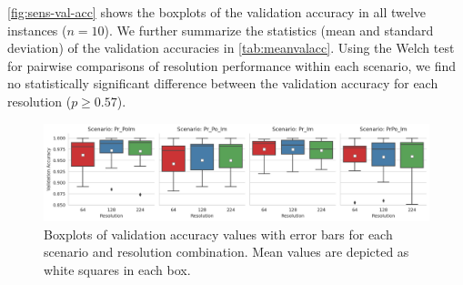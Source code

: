 \documentclass[Journal,letterpaper, SingleSpace, InsideFigs]{ascelike-new}
\begin{document}
\autoref{fig:sens-val-acc} shows the boxplots of the validation accuracy in all twelve instances ($n=10$).
We further summarize the statistics (mean and standard deviation) of the validation accuracies in \autoref{tab:meanvalacc}.
Using the Welch test for pairwise comparisons of resolution performance within each scenario, we find no statistically significant difference between the validation accuracy for each resolution ($p\ge 0.57$).
\begin{figure}[ht]
    \centering
    \includegraphics[width=\textwidth]{figures/scenario_resolution_validation_accuracy_boxplot.png}
    \caption{Boxplots of validation accuracy values with error bars for each scenario and resolution combination. Mean values are depicted as white squares in each box.}
    \label{fig:sens-val-acc}
\end{figure}
\end{document}
